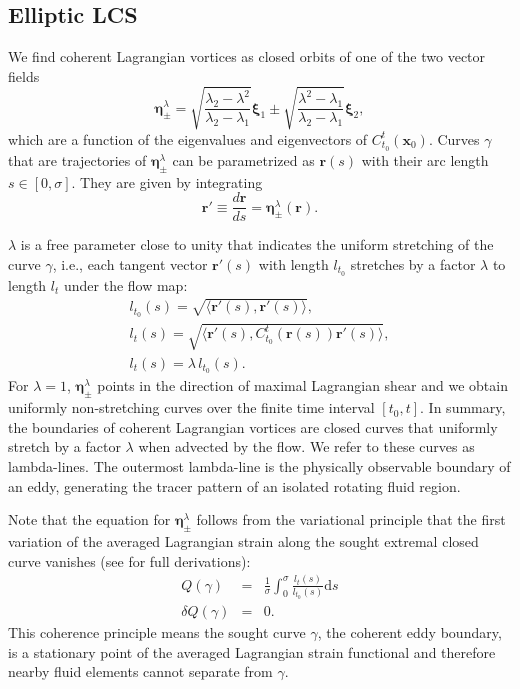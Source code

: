 \documentclass{article}
\begin{document}
\subsection{Elliptic LCS}
We find coherent Lagrangian vortices as closed orbits of one of the two vector fields
\begin{equation}
\boldsymbol \eta^{\lambda}_\pm = \sqrt{\frac{\lambda_2 - \lambda^2}{\lambda_2 - \lambda_1}} \boldsymbol \xi_1 \pm \sqrt{\frac{\lambda^2 - \lambda_1}{\lambda_2 - \lambda_1}} \boldsymbol \xi_2,
\label{eq:eta}
\end{equation}
which are a function of the eigenvalues and eigenvectors of $C_{t_0}^t(\boldsymbol x_0)$. Curves $\gamma$ that are trajectories of $\boldsymbol \eta^{\lambda}_\pm$ can be parametrized as $\boldsymbol r(s)$ with their arc length $s \in [0,\sigma]$. They are given by integrating
\begin{equation}
\boldsymbol r' \equiv \frac{d \boldsymbol r}{ds} = \boldsymbol \eta^{\lambda}_\pm(\boldsymbol r).
\label{eq:etafields}
\end{equation}

$\lambda$ is a free parameter close to unity that indicates the uniform stretching of the curve $\gamma$, i.e., each tangent vector $\boldsymbol r'(s)$ with length $l_{t_0}$ stretches by a factor $\lambda$ to length $l_{t}$ under the flow map:
\begin{gather*}
l_{t_0}(s) = \sqrt{\langle \boldsymbol r'(s), \boldsymbol r'(s) \rangle},\\
l_t(s) = \sqrt{\langle \boldsymbol r'(s), C_{t_0}^t(\boldsymbol r(s)) \boldsymbol r'(s) \rangle},\\
l_t(s) = \lambda\, l_{t_0}(s).
\end{gather*}
For $\lambda=1$, $\boldsymbol \eta^{\lambda}_\pm$ points in the direction of maximal Lagrangian shear and we obtain uniformly non-stretching curves over the finite time interval $[t_0, t]$. In summary, the boundaries of coherent Lagrangian vortices are closed curves that uniformly stretch by a factor $\lambda$ when advected by the flow. We refer to these curves as lambda-lines. The outermost lambda-line is the physically observable boundary of an eddy, generating the tracer pattern of an isolated rotating fluid region.

Note that the equation for $\boldsymbol \eta^{\lambda}_\pm$ follows from the variational principle that the first variation of the averaged Lagrangian strain along the sought extremal closed curve vanishes (see \parencite{haller13:_coher_lagran} for full derivations):
\begin{eqnarray*}
Q(\gamma) &=& \frac{1}{\sigma} \int_0^\sigma \frac{l_t(s)}{l_{t_0}(s)}\text{d}s\\
\delta Q(\gamma) &=& 0.
\end{eqnarray*}
This coherence principle means the sought curve $\gamma$, the coherent eddy boundary, is a stationary point of the averaged Lagrangian strain functional and therefore nearby fluid elements cannot separate from $\gamma$.
\end{document}
